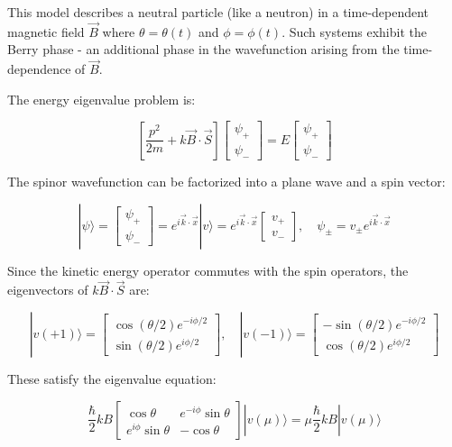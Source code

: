 This model describes a neutral particle (like a neutron) in a time-dependent magnetic field $\vec{B}$ where $\theta=\theta(t)$ and $\phi=\phi(t)$. Such systems exhibit the Berry phase - an additional phase in the wavefunction arising from the time-dependence of $\vec{B}$.

The energy eigenvalue problem is:

\[
\left[\frac{p^{2}}{2 m}+k \vec{B} \cdot \vec{S}\right]\left[\begin{array}{l}
\psi_{+}  \\
\psi_{-}
\end{array}\right]=E\left[\begin{array}{l}
\psi_{+} \\
\psi_{-}
\end{array}\right]
\]

The spinor wavefunction can be factorized into a plane wave and a spin vector:

\[
|\psi\rangle=\left[\begin{array}{l}
\psi_{+}  \\
\psi_{-}
\end{array}\right]=e^{i \vec{k} \cdot \vec{x}}|v\rangle=e^{i \vec{k} \cdot \vec{x}}\left[\begin{array}{l}
v_{+} \\
v_{-}
\end{array}\right], \quad \psi_{\pm}=v_{\pm} e^{i \vec{k} \cdot \vec{x}}
\]

Since the kinetic energy operator commutes with the spin operators, the eigenvectors of $k \vec{B} \cdot \vec{S}$ are:

\[
|v(+1)\rangle=\left[\begin{array}{c}
\cos (\theta/2) e^{-i \phi/2}  \\
\sin (\theta/2) e^{i \phi/2}
\end{array}\right], \quad|v(-1)\rangle=\left[\begin{array}{c}
-\sin (\theta/2) e^{-i \phi/2} \\
\cos (\theta/2) e^{i \phi/2}
\end{array}\right]
\]

These satisfy the eigenvalue equation:

\[
\frac{\hbar}{2} k B\left[\begin{array}{cc}
\cos \theta & e^{-i \phi} \sin \theta  \\
e^{i \phi} \sin \theta & -\cos \theta
\end{array}\right]|v(\mu)\rangle=\mu \frac{\hbar}{2} k B|v(\mu)\rangle
\]

